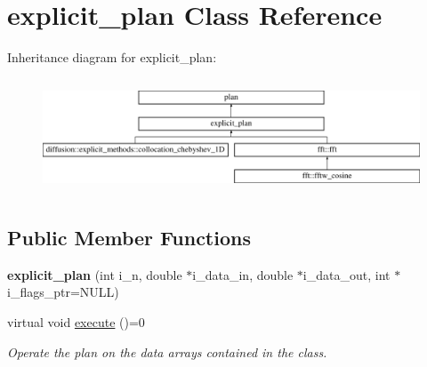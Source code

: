 \hypertarget{classexplicit__plan}{\section{explicit\-\_\-plan Class Reference}
\label{classexplicit__plan}
}
Inheritance diagram for explicit\-\_\-plan\-:\begin{figure}[H]
\begin{center}
\leavevmode
\includegraphics[height=3.446154cm]{classexplicit__plan}
\end{center}
\end{figure}
\subsection*{Public Member Functions}
\begin{DoxyCompactItemize}
\item 
\hypertarget{classexplicit__plan_a1a25f80a8b005b6c8ceb8916f85a7984}{{\bfseries explicit\-\_\-plan} (int i\-\_\-n, double $\ast$i\-\_\-data\-\_\-in, double $\ast$i\-\_\-data\-\_\-out, int $\ast$i\-\_\-flags\-\_\-ptr=N\-U\-L\-L)}\label{classexplicit__plan_a1a25f80a8b005b6c8ceb8916f85a7984}

\item 
virtual void \hyperlink{classplan_a2aaf5789c18317995b2eaf168e839fb5}{execute} ()=0
\begin{DoxyCompactList}\small\item\em Operate the plan on the data arrays contained in the class. \end{DoxyCompactList}\end{DoxyCompactItemize}
